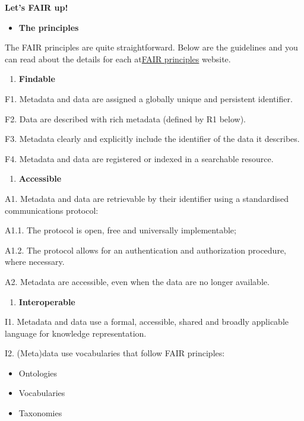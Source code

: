 \documentclass[
]{book}
\providecommand{\tightlist}{%
  \setlength{\itemsep}{0pt}\setlength{\parskip}{0pt}}
\begin{document}
\textbf{Let's FAIR up!}

\begin{itemize}
\tightlist
\item
  \textbf{The principles}
\end{itemize}

The FAIR principles are quite straightforward. Below are the guidelines and you can read about the details for each at\href{https://www.go-fair.org/fair-principles/}{FAIR principles} website.

\begin{enumerate}
\def\labelenumi{\arabic{enumi}.}
\tightlist
\item
  \textbf{Findable}
\end{enumerate}

F1. Metadata and data are assigned a globally unique and persistent identifier.

F2. Data are described with rich metadata (defined by R1 below).

F3. Metadata clearly and explicitly include the identifier of the data it describes.

F4. Metadata and data are registered or indexed in a searchable resource.

\begin{enumerate}
\def\labelenumi{\arabic{enumi}.}
\tightlist
\item
  \textbf{Accessible}
\end{enumerate}

A1. Metadata and data are retrievable by their identifier using a standardised communications protocol:

A1.1. The protocol is open, free and universally implementable;

A1.2. The protocol allows for an authentication and authorization procedure, where necessary.

A2. Metadata are accessible, even when the data are no longer available.

\begin{enumerate}
\def\labelenumi{\arabic{enumi}.}
\tightlist
\item
  \textbf{Interoperable}
\end{enumerate}

I1. Metadata and data use a formal, accessible, shared and broadly applicable language for knowledge representation.

I2. (Meta)data use vocabularies that follow FAIR principles:

\begin{itemize}
\tightlist
\item
  Ontologies
\item
  Vocabularies
\item
  Taxonomies
\end{itemize}
\end{document}
